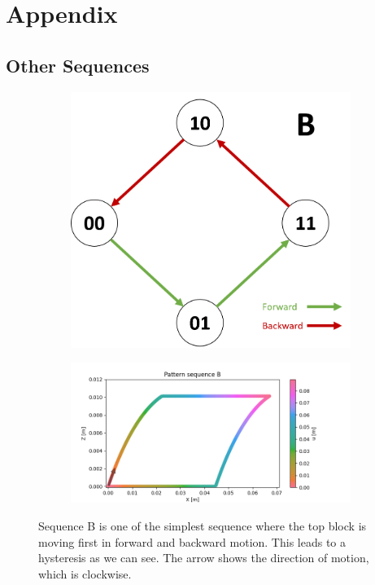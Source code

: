 \appendix
\chapter{Appendix}

\section{Other Sequences}\label{sec:appendix_real_sequences}
    \begin{figure}[h]
        \centering
        \begin{subfigure}{.2\textwidth}
        \includegraphics[width=\textwidth]{images/S_B.png}
        \end{subfigure}%
        \begin{subfigure}{.6\textwidth}
        \includegraphics[width=\textwidth]{images/B.png}
        \end{subfigure}
        \caption{Sequence B is one of the simplest sequence where the top block is moving first in forward and backward motion. This leads to a hysteresis as we can see. The arrow shows the direction of motion, which is clockwise.}
        \label{fig:appendix_seq_B}
    \end{figure}
    
